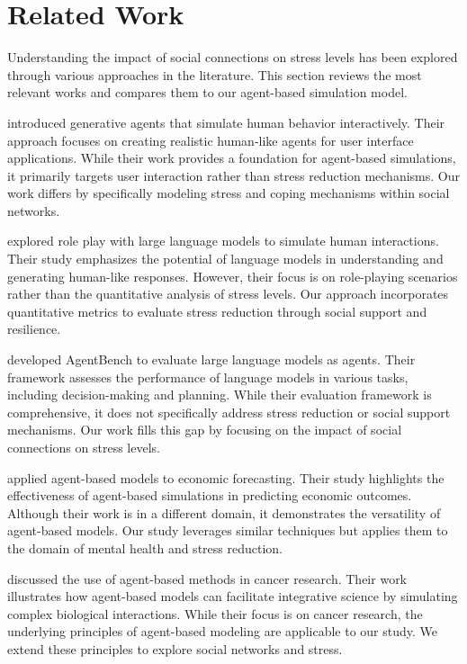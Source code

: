 \documentclass{article} %
\begin{document}
\section{Related Work}
\label{sec:related}

Understanding the impact of social connections on stress levels has been explored through various approaches in the literature. This section reviews the most relevant works and compares them to our agent-based simulation model.

\citet{park2023generative} introduced generative agents that simulate human behavior interactively. Their approach focuses on creating realistic human-like agents for user interface applications. While their work provides a foundation for agent-based simulations, it primarily targets user interaction rather than stress reduction mechanisms. Our work differs by specifically modeling stress and coping mechanisms within social networks.

\citet{shanahan2023role} explored role play with large language models to simulate human interactions. Their study emphasizes the potential of language models in understanding and generating human-like responses. However, their focus is on role-playing scenarios rather than the quantitative analysis of stress levels. Our approach incorporates quantitative metrics to evaluate stress reduction through social support and resilience.

\citet{liu2023agentbench} developed AgentBench to evaluate large language models as agents. Their framework assesses the performance of language models in various tasks, including decision-making and planning. While their evaluation framework is comprehensive, it does not specifically address stress reduction or social support mechanisms. Our work fills this gap by focusing on the impact of social connections on stress levels.

\citet{poledna2023economic} applied agent-based models to economic forecasting. Their study highlights the effectiveness of agent-based simulations in predicting economic outcomes. Although their work is in a different domain, it demonstrates the versatility of agent-based models. Our study leverages similar techniques but applies them to the domain of mental health and stress reduction.

\citet{west2023agent} discussed the use of agent-based methods in cancer research. Their work illustrates how agent-based models can facilitate integrative science by simulating complex biological interactions. While their focus is on cancer research, the underlying principles of agent-based modeling are applicable to our study. We extend these principles to explore social networks and stress.
\end{document}
